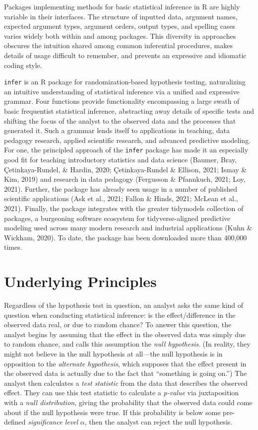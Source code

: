 \documentclass[10pt,a4paper,onecolumn]{article}
\begin{document}
Packages implementing methods for basic statistical inference in R are
highly variable in their interfaces. The structure of inputted data,
argument names, expected argument types, argument orders, output types,
and spelling cases varies widely both within and among packages. This
diversity in approaches obscures the intuition shared among common
inferential procedures, makes details of usage difficult to remember,
and prevents an expressive and idiomatic coding style.

\texttt{infer} is an R package for randomization-based hypothesis
testing, naturalizing an intuitive understanding of statistical
inference via a unified and expressive grammar. Four functions provide
functionality encompassing a large swath of basic frequentist
statistical inference, abstracting away details of specific tests and
shifting the focus of the analyst to the observed data and the processes
that generated it. Such a grammar lends itself to applications in
teaching, data pedagogy research, applied scientific research, and
advanced predictive modeling. For one, the principled approach of the
\texttt{infer} package has made it an especially good fit for teaching
introductory statistics and data science (Baumer, Bray,
Çetinkaya-Rundel, \& Hardin, 2020; Çetinkaya-Rundel \& Ellison, 2021;
Ismay \& Kim, 2019) and research in data pedagogy (Fergusson \&
Pfannkuch, 2021; Loy, 2021). Further, the package has already seen usage
in a number of published scientific applications (Ask et al., 2021;
Fallon \& Hinds, 2021; McLean et al., 2021). Finally, the package
integrates with the greater tidymodels collection of packages, a
burgeoning software ecosystem for tidyverse-aligned predictive modeling
used across many modern research and industrial applications (Kuhn \&
Wickham, 2020). To date, the package has been downloaded more than
400,000 times.

\hypertarget{underlying-principles}{%
\section{Underlying Principles}\label{underlying-principles}}

Regardless of the hypothesis test in question, an analyst asks the same
kind of question when conducting statistical inference: is the
effect/difference in the observed data real, or due to random chance? To
answer this question, the analyst begins by assuming that the effect in
the observed data was simply due to random chance, and calls this
assumption the \emph{null hypothesis}. (In reality, they might not
believe in the null hypothesis at all---the null hypothesis is in
opposition to the \emph{alternate hypothesis}, which supposes that the
effect present in the observed data is actually due to the fact that
``something is going on.'') The analyst then calculates a \emph{test
statistic} from the data that describes the observed effect. They can
use this test statistic to calculate a \emph{p-value} via juxtaposition
with a \emph{null distribution}, giving the probability that the
observed data could come about if the null hypothesis were true. If this
probability is below some pre-defined \emph{significance level}
\(\alpha\), then the analyst can reject the null hypothesis.
\end{document}
